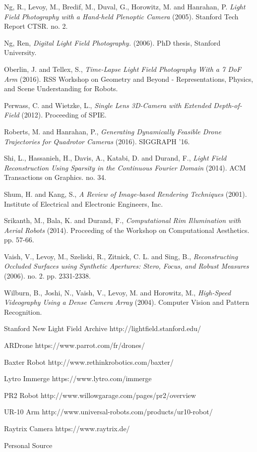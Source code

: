 \documentclass[12pt]{report}
\begin{document}
\begin{thebibliography}{10}
	Ng, R., Levoy, M., Bredif, M., Duval, G., Horowitz, M. and Hanrahan, P. \emph{Light Field Photography with a Hand-held Plenoptic Camera} (2005). Stanford Tech Report CTSR. no. 2.

	Ng, Ren, \emph{Digital Light Field Photography.} (2006). PhD thesis, Stanford University.	

	Oberlin, J. and Tellex, S., \emph{Time-Lapse Light Field Photography With a 7 DoF Arm} (2016). RSS Workshop on Geometry and Beyond - Representations, Physics, and Scene Understanding for Robots. 

	Perwass, C. and Wietzke, L., \emph{Single Lens 3D-Camera with Extended Depth-of-Field} (2012). Proceeding of SPIE.

	Roberts, M. and Hanrahan, P., \emph{Generating Dynamically Feasible Drone Trajectories for Quadrotor Cameras} (2016). SIGGRAPH '16.

	Shi, L., Hassanieh, H., Davis, A., Katabi, D. and Durand, F., \emph{Light Field Reconstruction Using Sparsity in the Continuous Fourier Domain} (2014). ACM Transactions on Graphics. no. 34.

	Shum, H. and Kang, S., \emph{A Review of Image-based Rendering Techniques} (2001). Institute of Electrical and Electronic Engineers, Inc.

	Srikanth, M., Bala, K. and Durand, F., \emph{Computational Rim Illumination with Aerial Robots} (2014). Proceeding of the Workshop on Computational Aesthetics. pp. 57-66.

	Vaish, V., Levoy, M., Szeliski, R., Zitnick, C. L. and Sing, B., \emph{Reconstructing Occluded Surfaces using Synthetic Apertures: Stero, Focus, and Robust Measures} (2006). no. 2. pp. 2331-2338.
	
	Wilburn, B., Joshi, N., Vaish, V., Levoy, M. and Horowitz, M., \emph{High-Speed Videography Using a Dense Camera Array} (2004). Computer Vision and Pattern Recognition.

	Stanford New Light Field Archive http://lightfield.stanford.edu/

	ARDrone https://www.parrot.com/fr/drones/

	Baxter Robot http://www.rethinkrobotics.com/baxter/
	
	Lytro Immerge https://www.lytro.com/immerge
	
	PR2 Robot http://www.willowgarage.com/pages/pr2/overview
	
	UR-10 Arm http://www.universal-robots.com/products/ur10-robot/
	
	Raytrix Camera https://www.raytrix.de/
	
	Personal Source

\end{thebibliography}
\end{document}
